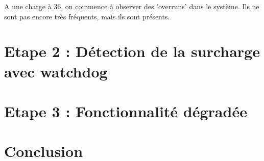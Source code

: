 \documentclass[a4paper,12pt]{article}
\begin{document}
A une charge à 36, on commence à observer des 'overruns' dans le système. Ils ne sont pas encore très fréquents, mais ils sont présents.

\newpage

\section{Etape 2 : Détection de la surcharge avec watchdog}



\newpage

\section{Etape 3 : Fonctionnalité dégradée}



\newpage

\section{Conclusion}
\end{document}

